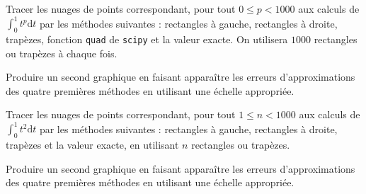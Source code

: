  \question{} Tracer les nuages de points correspondant, pour tout $0\leq p < 1000$ aux calculs de $\displaystyle\int_0^1 t^p \mathrm{d}t$ par les méthodes suivantes : rectangles à gauche, rectangles à droite, trapèzes, fonction \texttt{quad} de \texttt{scipy} et la valeur exacte.
  On utilisera $1000$ rectangles ou trapèzes à chaque fois.
  

\question{} Produire un second graphique en faisant apparaître les erreurs d'approximations des quatre premières méthodes en utilisant une échelle appropriée. 

\question{} Tracer les nuages de points correspondant, pour tout $1\leq n < 1000$ aux calculs de $\displaystyle\int_0^1 t^2 \mathrm{d}t$ par les méthodes suivantes : rectangles à gauche, rectangles à droite, trapèzes  et la valeur exacte, en utilisant $n$ rectangles ou trapèzes.
  
\question{} Produire un second graphique en faisant apparaître les erreurs d'approximations des quatre premières méthodes en utilisant une échelle appropriée. 
